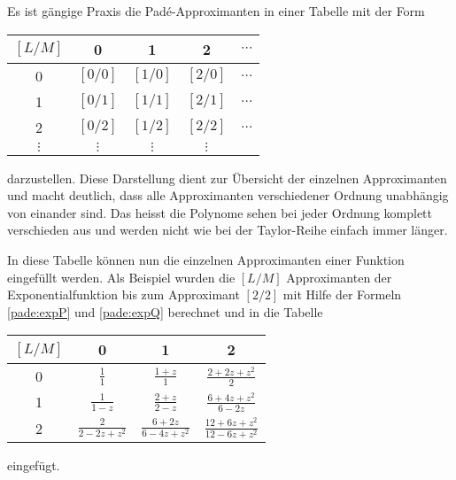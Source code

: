 Es ist gängige Praxis die Padé-Approximanten in einer Tabelle mit der Form
\begin{center}
	\begin{tabular}{c| c c c c}
		
		$[L/M]$ 	& 0 		& 1 		& 2 		& $\cdots$ \\
		\hline
		0 		& $[0/0]$ 	& $[1/0]$ 	& $[2/0]$ 	& $\dots$ \\
		1 		& $[0/1]$ 	& $[1/1]$ 	& $[2/1]$ 	& $\dots$ \\
		2 		& $[0/2]$ 	& $[1/2]$ 	& $[2/2]$ 	& $\dots$ \\
		$\vdots$ 	& $\vdots$ 	& $\vdots$  	& $\vdots$  	&  \\
	\end{tabular}
\end{center}
darzustellen.
Diese Darstellung dient zur Übersicht der einzelnen Approximanten und macht deutlich, dass alle Approximanten verschiedener Ordnung unabhängig von einander sind. 
Das heisst die Polynome sehen bei jeder Ordnung komplett verschieden aus und werden nicht wie bei der Taylor-Reihe einfach immer länger. 


In diese Tabelle können nun die einzelnen Approximanten einer Funktion eingefüllt werden.
Als Beispiel wurden die $[L/M]$ Approximanten der Exponentialfunktion
bis zum Approximant $[2/2]$
mit Hilfe der Formeln \ref{pade:expP} und \ref{pade:expQ} berechnet und
in die Tabelle
\begin{center}
\renewcommand\arraystretch{2.2}
	\begin{tabular}{c| c c c }
		$[L/M]$ 	& 0 		& 1 		& 2 	 \\
		\hline
		0 		&  $\displaystyle\frac{1}{1}$ 	& $\displaystyle\frac{1+z}{1}$ 	& $\displaystyle\frac{2+2 z+z^{2}}{2}$ \\
		1 		& $\displaystyle \frac{1}{1-z}$ 	& $\displaystyle\frac{2+z}{2-z}$ 	& $\displaystyle\frac{6+4 z+z^{2}}{6-2 z}$ 	 \\
		2 		& $\displaystyle\frac{2}{2-2 z+z^{2}} $ 	& $\displaystyle\frac{6+2 z}{6-4 z+z^{2}}$ 	& $\displaystyle\frac{12+6 z+z^{2}}{12-6 z+z^{2}}$ 	 \\
	\end{tabular}
\end{center}
eingefügt.













